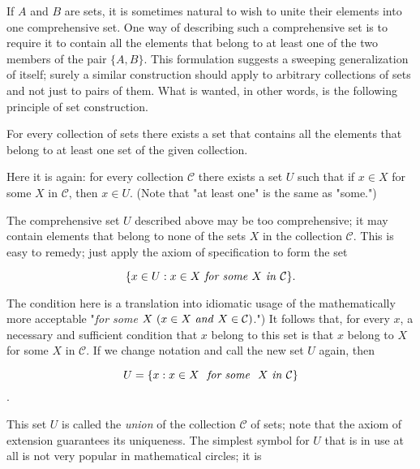 
If $A$ and $B$ are sets, it is sometimes natural to wish to unite their elements into one comprehensive set. One way of describing such a comprehensive set is to require it to contain all the elements that belong to at least one of the two members of the pair $ \{ A, B \}$. This formulation suggests a sweeping  generalization of itself; surely a similar construction should apply to arbitrary collections of sets and not just to pairs of them. What is wanted, in other words, is the following principle of set construction.

\begin{named}  For every collection of sets there exists a set that contains all the elements that belong to at least one set of the given collection.
\end{named}

Here it is again: for every collection $\mathcal{C}$ there exists a set $U$ such that if $x \in X$ for some $X$ in $\mathcal{C}$, then $ x \in U$. (Note that "at least one" is the same as "some.") 

The comprehensive set $U$ described above may be too comprehensive; it may contain elements that belong to none of the sets $X$ in the collection $\mathcal{C}$. This is easy to remedy; just apply the axiom of specification to form the set 

\begin{equation*}
\{ x \in U: x \in X \text{ \textit{for some} } X \text{ \textit{in} } \mathcal{C} \}.
\end{equation*}

The condition here is a translation into idiomatic usage of the mathematically more acceptable "\textit{for some} $X\ (x \in X \text{ \textit{and} } X \in \mathcal{C})$.") It follows that, for every $x$, a necessary and sufficient condition that $x$ belong to this set is that $x$ belong to $X$ for some $X$ in $\mathcal{C}$. If we change notation and call the new set $U$ again, then

\begin{equation*}
U = \{ x: x \in X \text{ \textit{ for some } } X \text{ \textit{in} }  \mathcal{C} \}
\end{equation*}.

This set $U$ is called the \textit{union} of the collection $\mathcal{C}$ of sets; note that the axiom of extension guarantees its uniqueness. The simplest symbol for $U$ that is in use at all is not very popular in mathematical circles; it is 

